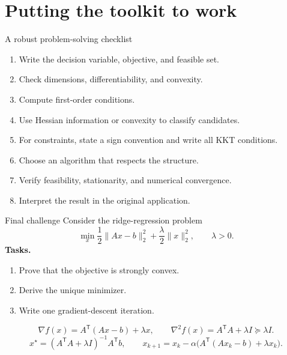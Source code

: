 \documentclass[aspectratio=169,11pt]{beamer}
\newcommand{\trans}{^{\mathsf T}}
\newcommand{\grad}{\nabla}
\begin{document}
\section{Putting the toolkit to work}

\begin{frame}{A robust problem-solving checklist}
  \begin{enumerate}
    \item Write the decision variable, objective, and feasible set.
    \item Check dimensions, differentiability, and convexity.
    \item Compute first-order conditions.
    \item Use Hessian information or convexity to classify candidates.
    \item For constraints, state a sign convention and write all KKT conditions.
    \item Choose an algorithm that respects the structure.
    \item Verify feasibility, stationarity, and numerical convergence.
    \item Interpret the result in the original application.
  \end{enumerate}
\end{frame}

\begin{frame}{Final challenge}
  Consider the ridge-regression problem
  \[
    \min_x \frac12\|Ax-b\|_2^2+\frac{\lambda}{2}\|x\|_2^2,
    \qquad \lambda>0.
  \]
  \textbf{Tasks.}
  \begin{enumerate}
    \item Prove that the objective is strongly convex.
    \item Derive the unique minimizer.
    \item Write one gradient-descent iteration.
  \end{enumerate}

  \pause
  \[
    \grad f(x)=A\trans(Ax-b)+\lambda x,
    \qquad
    \grad^2f(x)=A\trans A+\lambda I\succeq\lambda I.
  \]
  \pause
  \[
    \boxed{x^\star=(A\trans A+\lambda I)^{-1}A\trans b,}
    \qquad
    x_{k+1}=x_k-\alpha\bigl(A\trans(Ax_k-b)+\lambda x_k\bigr).
  \]
\end{frame}
\end{document}
